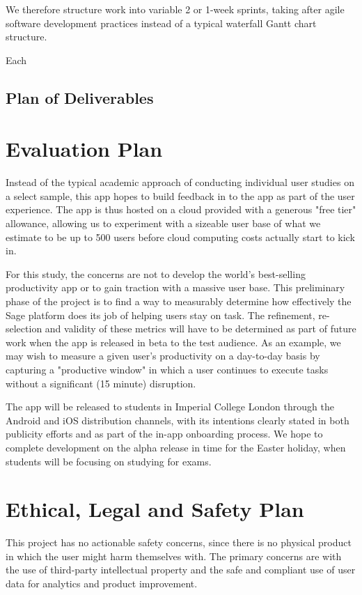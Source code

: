 We therefore structure work into variable 2 or 1-week sprints, taking after agile software development practices instead of a typical waterfall Gantt chart structure. 

Each 

\subsection{Plan of Deliverables}


\section{Evaluation Plan}
Instead of the typical academic approach of conducting individual user studies on a select sample, this app hopes to build feedback in to the app as part of the user experience. The app is thus hosted on a cloud provided with a generous "free tier" allowance, allowing us to experiment with a sizeable user base of what we estimate to be up to 500 users before cloud computing costs actually start to kick in.

For this study, the concerns are not to develop the world's best-selling productivity app or to gain traction with a massive user base. This preliminary phase of the project is to find a way to measurably determine how effectively the Sage platform does its job of helping users stay on task. The refinement, re-selection and validity of these metrics will have to be determined as part of future work when the app is released in beta to the test audience. As an example, we may wish to measure a given user's productivity on a day-to-day basis by capturing a "productive window" in which a user continues to execute tasks without a significant (15 minute) disruption.

The app will be released to students in Imperial College London through the Android and iOS distribution channels, with its intentions clearly stated in both publicity efforts and as part of the in-app onboarding process. We hope to complete development on the alpha release in time for the Easter holiday, when students will be focusing on studying for exams.

\section{Ethical, Legal and Safety Plan}
This project has no actionable safety concerns, since there is no physical product in which the user might harm themselves with. The primary concerns are with the use of third-party intellectual property and the safe and compliant use of user data for analytics and product improvement.

